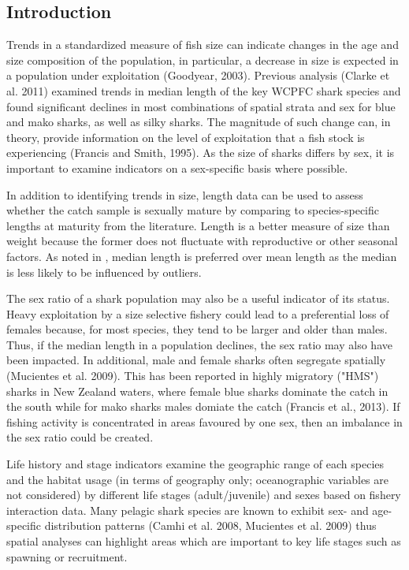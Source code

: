 \documentclass[12pt]{SCreport}
\begin{document}
\subsection{Introduction}


Trends in a standardized measure of fish size can indicate changes in the age and size composition of the population, in particular, a decrease in size is expected in a population under exploitation (Goodyear, 2003).  Previous analysis (Clarke et al. 2011) examined trends in median length of the key WCPFC shark species and found significant declines in most combinations of spatial strata and sex for blue and mako sharks, as well as silky sharks.  The magnitude of such change can, in theory, provide information on the level of exploitation that a fish stock is experiencing (Francis and Smith, 1995). As the size of sharks differs by sex, it is important to examine indicators on a sex-specific basis where possible. 

In addition to identifying trends in size, length data can be used to assess whether the catch sample is sexually mature by comparing to species-specific lengths at maturity from the literature.  Length is a better measure of size than weight because the former does not fluctuate with reproductive or other seasonal factors. As noted in \citet{Francis2014_a}, median length is preferred over mean length as the median is less likely to be influenced by outliers. 


The sex ratio of a shark population may also be a useful indicator of its status. Heavy exploitation by a size selective fishery could lead to a preferential loss of females because, for most species, they tend to be larger and older than males. Thus, if the median length in a population declines, the sex ratio may also have been impacted. In additional, male and female sharks often segregate spatially (Mucientes et al. 2009). This has been reported in highly migratory ("HMS") sharks in New Zealand waters, where female blue sharks dominate the  catch in the south while for mako sharks males domiate the catch (Francis et al., 2013). If fishing activity is concentrated in areas favoured by one sex, then an imbalance in the sex ratio could be created.


Life history and stage indicators examine the geographic range of each species and the habitat usage (in terms of geography only; oceanographic variables are not considered) by different life stages (adult/juvenile) and sexes based on fishery interaction data.  Many pelagic shark species are known to exhibit sex- and age- specific distribution patterns (Camhi et al. 2008, Mucientes et al. 2009) thus                                            spatial analyses can highlight areas which are important to key life stages such as spawning or recruitment.
\end{document}
